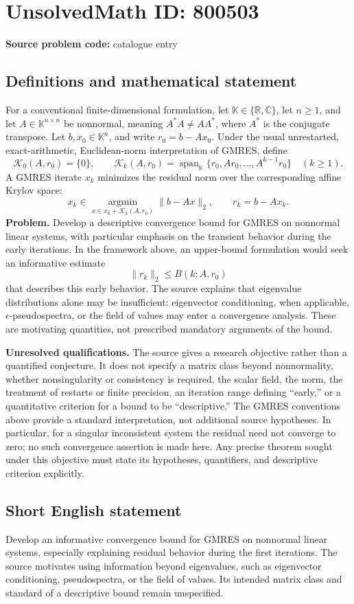 \documentclass[11pt]{article}
\newcommand{\R}{\mathbb{R}}
\newcommand{\C}{\mathbb{C}}
\begin{document}
\section*{UnsolvedMath ID: 800503}
\textbf{Source problem code:} catalogue entry
\subsection{Definitions and mathematical statement}
For a conventional finite-dimensional formulation, let \(\mathbb K\in\{\R,\C\}\), let \(n\geq 1\), and let \(A\in\mathbb K^{n\times n}\) be nonnormal, meaning \(A^*A\neq AA^*\), where \(A^*\) is the conjugate transpose. Let \(b,x_0\in\mathbb K^n\), and write \(r_0=b-Ax_0\). Under the usual unrestarted, exact-arithmetic, Euclidean-norm interpretation of GMRES, define
\[
\mathcal K_0(A,r_0)=\{0\},\qquad
\mathcal K_k(A,r_0)=\operatorname{span}_{\mathbb K}\{r_0,Ar_0,\ldots,A^{k-1}r_0\}\quad(k\geq1).
\]
A GMRES iterate \(x_k\) minimizes the residual norm over the corresponding affine Krylov space:
\[
x_k\in\underset{x\in x_0+\mathcal K_k(A,r_0)}{\operatorname{argmin}}\|b-Ax\|_2,
\qquad r_k=b-Ax_k.
\]
\textbf{Problem.} Develop a descriptive convergence bound for GMRES on nonnormal linear systems, with particular emphasis on the transient behavior during the early iterations. In the framework above, an upper-bound formulation would seek an informative estimate
\[
\|r_k\|_2\leq B(k;A,r_0)
\]
that describes this early behavior. The source explains that eigenvalue distributions alone may be insufficient: eigenvector conditioning, when applicable, \(\epsilon\)-pseudospectra, or the field of values may enter a convergence analysis. These are motivating quantities, not prescribed mandatory arguments of the bound.

\textbf{Unresolved qualifications.} The source gives a research objective rather than a quantified conjecture. It does not specify a matrix class beyond nonnormality, whether nonsingularity or consistency is required, the scalar field, the norm, the treatment of restarts or finite precision, an iteration range defining ``early,'' or a quantitative criterion for a bound to be ``descriptive.'' The GMRES conventions above provide a standard interpretation, not additional source hypotheses. In particular, for a singular inconsistent system the residual need not converge to zero; no such convergence assertion is made here. Any precise theorem sought under this objective must state its hypotheses, quantifiers, and descriptive criterion explicitly.
\subsection{Short English statement}
Develop an informative convergence bound for GMRES on nonnormal linear systems, especially explaining residual behavior during the first iterations. The source motivates using information beyond eigenvalues, such as eigenvector conditioning, pseudospectra, or the field of values. Its intended matrix class and standard of a descriptive bound remain unspecified.
\end{document}
